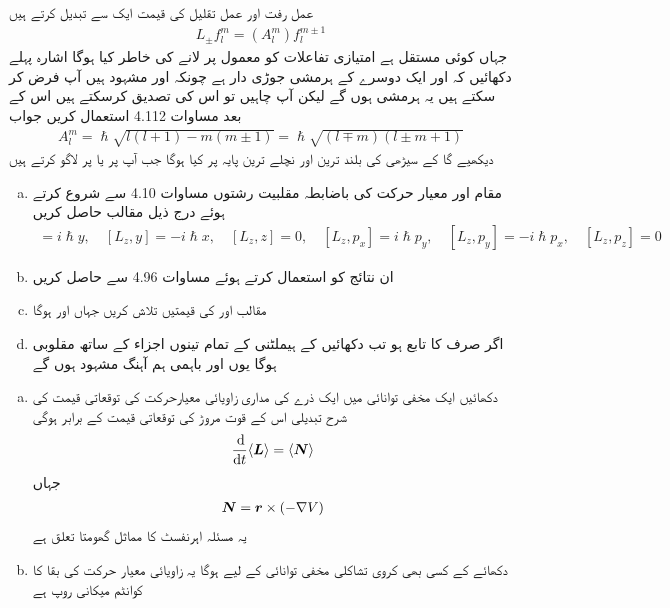 عمل رفت اور عمل تقلیل  کی قیمت ایک  سے تبدیل کرتے ہیں 
\begin{align}
L_{\pm} f_l^m = (A_l^m) f_l^{m \pm 1}
\end{align}
جہاں  کوئی مستقل ہے امتیازی تفاعلات کو معمول پر لانے کی خاطر  کیا ہوگا اشارہ پہلے دکھائیں کہ  اور  ایک دوسرے کے ہرمشی جوڑی دار ہے چونکہ  اور  مشہود ہیں آپ فرض کر سکتے ہیں یہ ہرمشی ہوں گے لیکن آپ چاہیں تو اس کی تصدیق کرسکتے ہیں اس کے بعد مساوات 4.112 استعمال کریں جواب 
\begin{align}
A_l^m = \hslash \sqrt{l (l +1) - m (m \pm 1)} = \hslash \sqrt{(l \mp m)(l \pm m + 1)} 
\end{align}
دیکھیے گا کے سیڑھی کی بلند ترین اور نچلے ترین پایہ پر کیا ہوگا جب آپ  پر  یا  پر  لاگو کرتے ہیں 
\begin{enumerate}[a.]
\item
مقام اور معیار حرکت کی باضابطہ  مقلبیت رشتوں   مساوات 4.10 سے شروع کرتے ہوئے درج ذیل مقالب  حاصل کریں 
\begin{align}
[[L_z , x] = i \hslash y, \quad [L_z , y] = - i \hslash x, \quad [L_z , z] = 0, \quad [L_z , p_x] = i \hslash p_y , 
\quad [L_z , p_y] = - i \hslash p_x , \quad [L_z , p_z] = 0
\end{align}
\item
ان نتائج کو استعمال کرتے ہوئے مساوات 4.96 سے   حاصل کریں 
\item
مقالب   اور  کی قیمتیں تلاش کریں جہاں  اور  ہوگا
\item
اگر  صرف  کا تابع ہو تب دکھائیں کے ہیملٹنی   کے تمام تینوں اجزاء کے ساتھ مقلوبی  ہوگا یوں   اور  باہمی ہم آہنگ مشہود ہوں گے 
\end{enumerate}
\begin{enumerate}[a.]
\item
دکھائیں ایک مخفی توانائی  میں ایک ذرے کی مداری زاویائی معیارحرکت  کی توقعاتی قیمت کی شرح  تبدیلی اس کے قوت مروڑ کی توقعاتی قیمت کے برابر ہوگی 
\begin{align*}
\frac{\dif}{\dif t} \langle \kvec{L} \rangle = \langle \kvec{N} \rangle
\end{align*}
جہاں 
\begin{align*}
{\ensuremath{{\boldsymbol{N}}}} = {{\boldsymbol{r}}} \times (- \nabla V)
\end{align*}
یہ مسئلہ اہرنفسٹ کا مماثل گھومتا تعلق ہے 
\item
دکھائے کے کسی بھی کروی تشاکلی مخفی توانائی کے لیے  ہوگا یہ زاویائی معیار حرکت کی بقا کا کوانٹم میکانی روپ ہے 
\end{enumerate}

